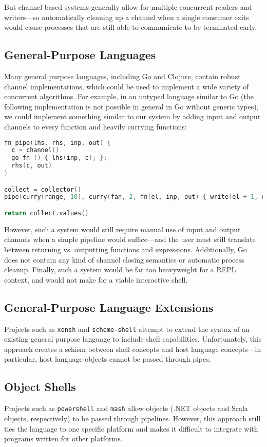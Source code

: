 \documentclass[english,PRO]{ipsj}
\begin{document}
But channel-based systems generally allow for multiple concurrent readers and writers---so automatically cleaning up a channel when a single consumer exits would cause processes that are still able to communicate to be terminated early.

\subsection{General-Purpose Languages}

\noindent
Many general purpose languages, including Go\cite{golang} and Clojure\cite{clojure}, contain robust channel implementations, which could be used to implement a wide variety of concurrent algorithms. For example, in an untyped language similar to Go (the following implementation is not possible in general in Go without generic types), we could implement something similar to our system by adding input and output channels to every function and heavily currying functions:
\begin{lstlisting}[language=C, morekeywords={fn,channel,nil,go}]
fn pipe(lhs, rhs, inp, out) {
  c = channel()
  go fn () { lhs(inp, c); };
  rhs(c, out)
}

collect = collector()
pipe(curry(range, 10), curry(fan, 2, fn(el, inp, out) { write(el + 1, out); }), nil, collect);

return collect.values()
\end{lstlisting}
\noindent
However, such a system would still require manual use of input and output channels when a simple pipeline would suffice---and the user must still translate between returning vs. outputting functions and expressions. Additionally, Go does not contain any kind of channel closing semantics or automatic process cleanup. Finally, such a system would be far too heavyweight for a REPL context, and would not make for a viable interactive shell.

\subsection{General-Purpose Language Extensions}
\noindent
Projects such as \verb/xonsh/\cite{xonsh} and \verb/scheme-shell/\cite{scheme-shell} attempt to extend the syntax of an existing general purpose language to include shell capabilities. Unfortunately, this approach creates a schism between shell concepts and host language concepts---in particular, host language objects cannot be passed through pipes.

\subsection{Object Shells}\noindent
Projects such as \verb/powershell/\cite{powershell} and \verb/mash/\cite{mash} allow objects (.NET objects and Scala objects, respectively) to be passed through pipelines. However, this approach still ties the language to one specific platform and makes it difficult to integrate with programs written for other platforms.
\end{document}
